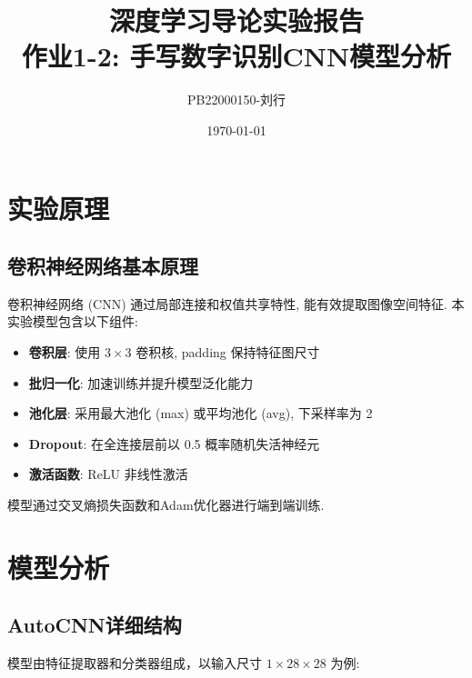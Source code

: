 \documentclass{article}
\title{深度学习导论实验报告 \\ 作业1-2: 手写数字识别CNN模型分析}
\author{PB22000150-刘行}
\date{\today}
\begin{document}
\maketitle

	\section{实验原理}
		\subsection{卷积神经网络基本原理}
			卷积神经网络 (CNN) 通过局部连接和权值共享特性, 能有效提取图像空间特征. 本实验模型包含以下组件:

			\begin{itemize}
				\item \textbf{卷积层}: 使用 $3 \times 3$ 卷积核, padding 保持特征图尺寸
				\item \textbf{批归一化}: 加速训练并提升模型泛化能力
				\item \textbf{池化层}: 采用最大池化 (max) 或平均池化 (avg), 下采样率为 2
				\item \textbf{Dropout}: 在全连接层前以 0.5 概率随机失活神经元
				\item \textbf{激活函数}: ReLU 非线性激活
			\end{itemize}

			模型通过交叉熵损失函数和Adam优化器进行端到端训练.

	\section{模型分析}
		\subsection{AutoCNN详细结构}
			模型由特征提取器和分类器组成，以输入尺寸 $1\times28\times28$  为例:
			
\end{document}
